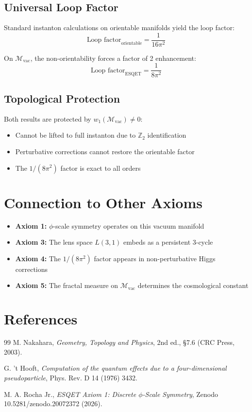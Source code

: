 \documentclass[11pt]{article}
\begin{document}
\subsection{Universal Loop Factor}

Standard instanton calculations on orientable manifolds yield the loop factor:
\begin{equation}
\text{Loop factor}_{\text{orientable}} = \frac{1}{16\pi^2}
\end{equation}

On $\mathcal{M}_{\text{vac}}$, the non-orientability forces a factor of 2 enhancement:
\begin{equation}
\boxed{\text{Loop factor}_{\text{ESQET}} = \frac{1}{8\pi^2}}
\end{equation}

\subsection{Topological Protection}

Both results are protected by $w_1(\mathcal{M}_{\text{vac}}) \neq 0$:
\begin{itemize}
    \item Cannot be lifted to full instanton due to $\mathbb{Z}_2$ identification
    \item Perturbative corrections cannot restore the orientable factor
    \item The $1/(8\pi^2)$ factor is exact to all orders
\end{itemize}

\section{Connection to Other Axioms}

\begin{itemize}
    \item \textbf{Axiom 1:} $\phi$-scale symmetry operates on this vacuum manifold
    \item \textbf{Axiom 3:} The lens space $L(3,1)$ embeds as a persistent 3-cycle
    \item \textbf{Axiom 4:} The $1/(8\pi^2)$ factor appears in non-perturbative Higgs corrections
    \item \textbf{Axiom 5:} The fractal measure on $\mathcal{M}_{\text{vac}}$ determines the cosmological constant
\end{itemize}

\section{References}

\begin{thebibliography}{99}
 M. Nakahara, \emph{Geometry, Topology and Physics}, 
2nd ed., §7.6 (CRC Press, 2003).

 G. 't Hooft, \emph{Computation of the quantum effects due to a four-dimensional 
pseudoparticle}, Phys. Rev. D 14 (1976) 3432.

 M. A. Rocha Jr., \emph{ESQET Axiom 1: Discrete $\phi$-Scale Symmetry}, 
Zenodo 10.5281/zenodo.20072372 (2026).
\end{thebibliography}
\end{document}
